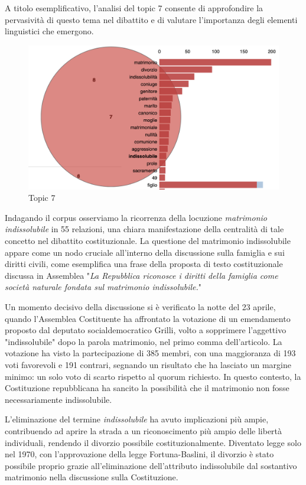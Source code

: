 \documentclass{article}
\begin{document}
A titolo esemplificativo, l'analisi del topic 7 consente di approfondire la pervasività di questo tema nel dibattito e di valutare l'importanza degli elementi linguistici che emergono.

\begin{figure}
    \centering
    \includegraphics[width=1\linewidth]{topic_7.png}
    \caption{Topic 7}
    \label{fig:enter-label}
\end{figure}

Indagando il corpus osserviamo la ricorrenza della locuzione \textit{matrimonio indissolubile} in 55 relazioni, una chiara manifestazione della centralità di tale concetto nel dibattito costituzionale. La questione del matrimonio indissolubile appare come un nodo cruciale all'interno della discussione sulla famiglia e sui diritti civili, come esemplifica una frase della proposta di testo costituzionale discussa in Assemblea "\textit{La Repubblica riconosce i diritti della famiglia come società naturale fondata sul matrimonio indissolubile.}"


Un momento decisivo della discussione si è verificato la notte del 23 aprile, quando l'Assemblea Costituente ha affrontato la votazione di un emendamento proposto dal deputato socialdemocratico Grilli, volto a sopprimere l'aggettivo "indissolubile" dopo la parola matrimonio, nel primo comma dell'articolo. La votazione ha visto la partecipazione di 385 membri, con una maggioranza di 193 voti favorevoli e 191 contrari, segnando un risultato che ha lasciato un margine minimo: un solo voto di scarto rispetto al quorum richiesto. In questo contesto, la Costituzione repubblicana ha sancito la possibilità che il matrimonio non fosse necessariamente indissolubile. 

L'eliminazione del termine \textit{indissolubile} ha avuto implicazioni più ampie, contribuendo ad aprire la strada a un riconoscimento più ampio delle libertà individuali, rendendo il divorzio possibile costituzionalmente. Diventato legge solo nel 1970, con l'approvazione della legge Fortuna-Baslini, il divorzio è stato possibile proprio grazie all'eliminazione dell'attributo indissolubile dal sostantivo matrimonio nella discussione sulla Costituzione. 
\end{document}
